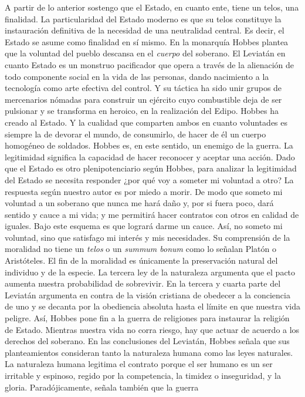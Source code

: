 \documentclass[
]{article}
\begin{document}
A partir de lo anterior sostengo que el Estado, en cuanto ente, tiene un
telos, una finalidad. La particularidad del Estado moderno es que su
telos constituye la instauración definitiva de la necesidad de una
neutralidad central. Es decir, el Estado se asume como finalidad en sí
mismo. En la monarquía Hobbes plantea que la voluntad del pueblo
descansa en el \emph{cuerpo} del soberano. El Leviatán en cuanto Estado
es un monstruo pacificador que opera a través de la alienación de todo
componente social en la vida de las personas, dando nacimiento a la
tecnología como arte efectiva del control. Y su táctica ha sido unir
grupos de mercenarios nómadas para construir un ejército cuyo
combustible deja de ser pulsionar y se transforma en heroico, en la
realización del Edipo. Hobbes ha creado al Estado. Y la cualidad que
comparten ambos en cuanto voluntades es siempre la de devorar el mundo,
de consumirlo, de hacer de él un cuerpo homogéneo de soldados. Hobbes
es, en este sentido, un enemigo de la guerra. La legitimidad significa
la capacidad de hacer reconocer y aceptar una acción. Dado que el Estado
es otro plenipotenciario según Hobbes, para analizar la legitimidad del
Estado se necesita responder ¿por qué voy a someter mi voluntad a otro?
La respuesta según nuestro autor es por miedo a morir. De modo que
someto mi voluntad a un soberano que nunca me hará daño y, por si fuera
poco, dará sentido y cauce a mi vida; y me permitirá hacer contratos con
otros en calidad de iguales. Bajo este esquema es que logrará darme un
cauce. Así, no someto mi voluntad, sino que satisfago mi interés y mis
necesidades. Su comprensión de la moralidad no tiene un \emph{telos} o
un \emph{summum bonum} como lo señalan Platón o Aristóteles. El fin de
la moralidad es únicamente la preservación natural del individuo y de la
especie. La tercera ley de la naturaleza argumenta que el pacto aumenta
nuestra probabilidad de sobrevivir. En la tercera y cuarta parte del
Leviatán argumenta en contra de la visión cristiana de obedecer a la
conciencia de uno y se decanta por la obediencia absoluta hasta el
límite en que nuestra vida peligre. Así, Hobbes pone fin a la guerra de
religiones para instaurar la religión de Estado. Mientras nuestra vida
no corra riesgo, hay que actuar de acuerdo a los derechos del soberano.
En las conclusiones del Leviatán, Hobbes señala que sus planteamientos
consideran tanto la naturaleza humana como las leyes naturales. La
naturaleza humana legitima el contrato porque el ser humano es un ser
irritable y espinoso, regido por la competencia, la timidez o
inseguridad, y la gloria. Paradójicamente, señala también que la guerra
\end{document}
